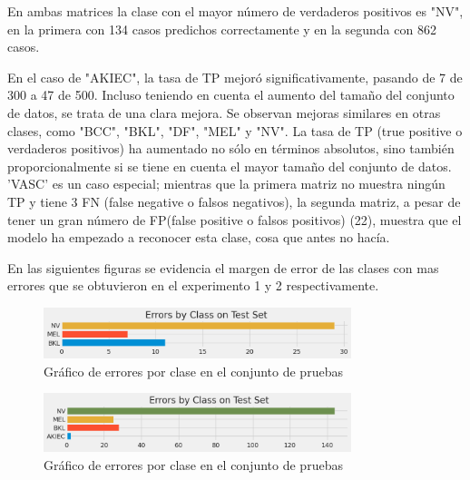 En ambas matrices la clase con el mayor número de verdaderos positivos es "NV", en la primera con 134 casos predichos correctamente y en la segunda con 862 casos.

En el caso de "AKIEC", la tasa de TP mejoró significativamente, pasando de 7 de 300 a 47 de 500. Incluso teniendo en cuenta el aumento del tamaño del conjunto de datos, se trata de una clara mejora. Se observan mejoras similares en otras clases, como "BCC", "BKL", "DF", "MEL" y "NV". La tasa de TP (true positive o verdaderos positivos) ha aumentado no sólo en términos absolutos, sino también proporcionalmente si se tiene en cuenta el mayor tamaño del conjunto de datos. 'VASC' es un caso especial; mientras que la primera matriz no muestra ningún TP y tiene 3 FN (false negative o falsos negativos), la segunda matriz, a pesar de tener un gran número de FP(false positive o falsos positivos) (22), muestra que el modelo ha empezado a reconocer esta clase, cosa que antes no hacía.

En las siguientes figuras se evidencia el margen de error de las clases con mas errores que se obtuvieron en el experimento 1 y 2 respectivamente.

\begin{figure}[ht]%
    \begin{center}
        \includegraphics[width=0.8\textwidth]{./Graphics/errorByClass_p1.png}
        \caption{Gráfico de errores por clase en el conjunto de pruebas\label{fig:class_errors_p1}}
    \end{center}
\end{figure} 

\begin{figure}[ht]%
    \begin{center}
        \includegraphics[width=0.8\textwidth]{./Graphics/errorByClass_p3.png}
            \caption{Gráfico de errores por clase en el conjunto de pruebas\label{fig:class_errors_p3}}
    \end{center}
\end{figure}


